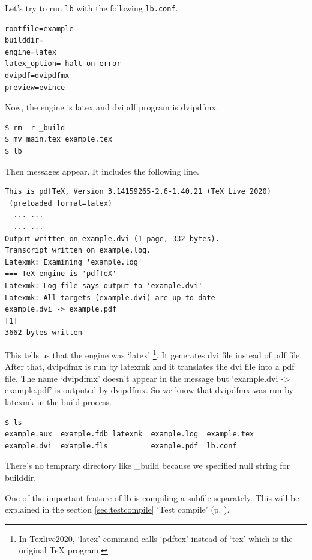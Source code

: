 Let's try to run \verb|lb| with the following \verb|lb.conf|.
\begin{verbatim}
rootfile=example
builddir=
engine=latex
latex_option=-halt-on-error
dvipdf=dvipdfmx
preview=evince
\end{verbatim}
Now, the engine is latex and dvipdf program is dvipdfmx.
\begin{verbatim}
$ rm -r _build
$ mv main.tex example.tex
$ lb
\end{verbatim}
Then messages appear.
It includes the following line.
\begin{verbatim}
This is pdfTeX, Version 3.14159265-2.6-1.40.21 (TeX Live 2020)
 (preloaded format=latex)
  ... ...
  ... ...
Output written on example.dvi (1 page, 332 bytes).
Transcript written on example.log.
Latexmk: Examining 'example.log'
=== TeX engine is 'pdfTeX'
Latexmk: Log file says output to 'example.dvi'
Latexmk: All targets (example.dvi) are up-to-date
example.dvi -> example.pdf
[1]
3662 bytes written
\end{verbatim}
This tells us that the engine was `latex'%
\footnote{
In Texlive2020, `latex' command calls `pdftex' instead of `tex' which is the original TeX program.
}.
It generates dvi file instead of pdf file.
After that, dvipdfmx is run by latexmk and it translates the dvi file into a pdf file.
The name `dvipdfmx' doesn't appear in the message but `example.dvi -{\textgreater} example.pdf' is outputed by dvipdfmx.
So we know that dvipdfmx was run by latexmk in the build process.
\begin{verbatim}
$ ls
example.aux  example.fdb_latexmk  example.log  example.tex
example.dvi  example.fls          example.pdf  lb.conf
\end{verbatim}
There's no temprary directory like \_build because we specified null string for builddir.

One of the important feature of lb is compiling a subfile separately.
This will be explained in the section  \ref{sec:testcompile} `Test compile' (p. \pageref{sec:testcompile}).

